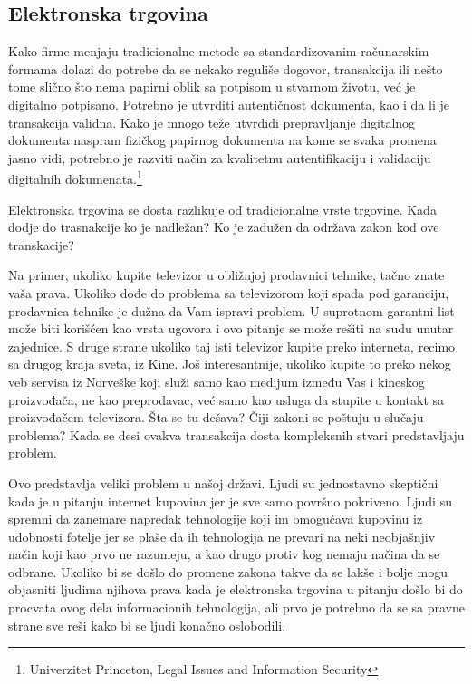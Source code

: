 \documentclass[a4paper]{article}
\begin{document}
{\subsection{Elektronska trgovina}

Kako firme menjaju tradicionalne metode sa standardizovanim ra\-ču\-na\-rskim formama dolazi do potrebe da se nekako reguliše dogovor, transakcija ili nešto tome slično što nema papirni oblik sa potpisom u stvarnom životu, već je digitalno potpisano. Potrebno je utvrditi autentičnost dokumenta, kao i da li je transakcija validna. Kako je mnogo teže utvrdidi prepravljanje digitalnog dokumenta naspram fizičkog papirnog dokumenta na kome se svaka promena jasno vidi, potrebno je razviti način za kvalitetnu autentifikaciju i validaciju digitalnih dokumenata.\footnote{Univerzitet Princeton, Legal Issues and Information Security}

Elektronska trgovina se dosta razlikuje od tradicionalne vrste trgovine. Kada dodje do trasnakcije ko je nadležan? Ko je zadužen da održava zakon kod ove transkacije?

Na primer, ukoliko kupite televizor u obližnjoj prodavnici tehnike, tačno znate vaša prava. Ukoliko dođe do problema sa televizorom koji spada pod garanciju, prodavnica tehnike je dužna da Vam ispravi problem. U suprotnom garantni list može biti korišćen kao vrsta ugovora i ovo pitanje se može rešiti na sudu unutar zajednice. S druge strane ukoliko taj isti televizor kupite preko interneta, recimo sa drugog kraja sveta, iz Kine. Još interesantnije, ukoliko kupite to preko nekog veb servisa iz Norveške koji služi samo kao medijum između Vas i kineskog proizvođača, ne kao preprodavac, već samo kao usluga da stupite u kontakt sa proizvođačem televizora. Šta se tu dešava? Čiji zakoni se poštuju u slučaju problema? Kada se desi ovakva transakcija dosta kompleksnih stvari predstavljaju problem.

Ovo predstavlja veliki problem u našoj državi. Ljudi su jednostavno skeptični kada je u pitanju internet kupovina jer je sve samo površno pokriveno. Ljudi su spremni da zanemare napredak tehnologije koji im omogućava kupovinu iz udobnosti fotelje jer se plaše da ih tehnologija ne prevari na neki neobjašnjiv način koji kao prvo ne razumeju, a kao drugo protiv kog nemaju načina da se odbrane. Ukoliko bi se došlo do promene zakona takve da se lakše i bolje mogu objasniti ljudima njihova prava kada je elektronska trgovina u pitanju došlo bi do procvata ovog dela informacionih tehnologija, ali prvo je potrebno da se sa pravne strane sve reši kako bi se ljudi konačno oslobodili.

}
\end{document}
